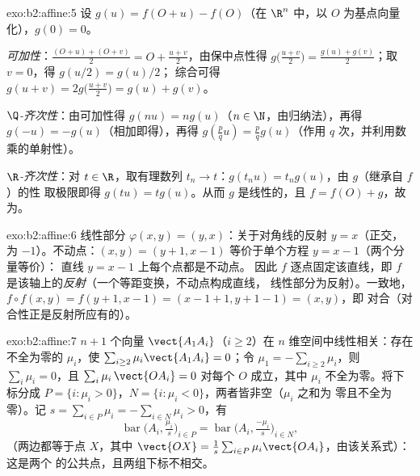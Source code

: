 \begin{solution}{exo:b2:affine:5}
设 $g(u) = f(O + u) - f(O)$（在 $\R^n$ 中，以
$O$ 为基点向量化），$g(0) = 0$。

\emph{可加性}：$\frac{(O + u) + (O + v)}{2} = O + \frac{u +
v}{2}$，由保中点性得 $g\bigl(\frac{u+v}{2}\bigr)
= \frac{g(u) + g(v)}{2}$；取 $v = 0$，得 $g(u/2) = g(u)/2$；
综合可得 $g(u + v) = 2g\bigl(\frac{u+v}{2}\bigr) = g(u) + g(v)$。

\emph{$\Q$-齐次性}：由可加性得 $g(nu) = ng(u)$（$n \in
\N$，由归纳法），再得 $g(-u) = -g(u)$（相加即得），再得 $g(\frac pq u) =
\frac pq g(u)$（作用 $q$ 次，并利用数乘的单射性）。

\emph{$\R$-齐次性}：对 $t \in \R$，取有理数列 $t_n \to
t$：$g(t_nu) = t_ng(u)$，由 $g$（继承自 $f$）的性
取极限即得 $g(tu) = tg(u)$。从而 $g$ 是线性的，且 $f =
f(O) + g$，故为。
\end{solution}

\begin{solution}{exo:b2:affine:6}
线性部分 $\varphi(x,y) = (y, x)$：关于对角线的反射
$y = x$（正交，为 $-1$）。不动点：$(x, y) = (y
+ 1, x - 1)$ 等价于单个方程 $y = x - 1$（两个分量等价）：
直线 $y = x - 1$ 上每个点都是不动点。
因此 $f$ 逐点固定该直线，即 $f$
是该轴上的\emph{反射}（一个等距变换，不动点构成直线，
线性部分为反射）。一致地，$f \circ
f(x,y) = f(y+1, x-1) = (x - 1 + 1, y + 1 - 1) = (x, y)$，即
对合（对合性正是反射所应有的）。
\end{solution}

\begin{solution}{exo:b2:affine:7}
$n + 1$ 个向量 $\vect{A_1A_i}$（$i \geq 2$）在
$n$ 维空间中线性相关：存在不全为零的 $\mu_i$，使 $\sum_{i\geq2}
\mu_i\vect{A_1A_i} = 0$；令 $\mu_1 = -\sum_{i \geq 2}\mu_i$，则
$\sum_{i}\mu_i = 0$，且 $\sum_i \mu_i\,\vect{OA_i} = 0$ 对每个
$O$ 成立，其中 $\mu_i$ 不全为零。将下标分成 $P = \{i : \mu_i >
0\}$，$N = \{i : \mu_i < 0\}$，两者皆非空（$\mu_i$ 之和为
零且不全为零）。记 $s = \sum_{i\in P}\mu_i =
-\sum_{i \in N}\mu_i > 0$，有
\[
\operatorname{bar}\bigl(A_i, \tfrac{\mu_i}{s}\bigr)_{i \in P}
= \operatorname{bar}\bigl(A_i, \tfrac{-\mu_i}{s}\bigr)_{i \in N},
\]
（两边都等于点 $X$，其中 $\vect{OX} = \frac1s\sum_{i\in
P}\mu_i\vect{OA_i}$，由该关系式）：这是两个
的公共点，且两组下标不相交。
\end{solution}

